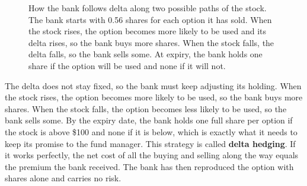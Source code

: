 \begin{figure}[htbp]
\centering
{}
\caption{How the bank follows delta along two possible paths of the stock. The bank starts with 0.56 shares for each option it has sold. When the stock rises, the option becomes more likely to be used and its delta rises, so the bank buys more shares. When the stock falls, the delta falls, so the bank sells some. At expiry, the bank holds one share if the option will be used and none if it will not.}
\label{fig:14-hedge}
\end{figure}

The delta does not stay fixed, so the bank must keep adjusting its holding. When the stock rises, the option becomes more likely to be used, so the bank buys more shares. When the stock falls, the option becomes less likely to be used, so the bank sells some. By the expiry date, the bank holds one full share per option if the stock is above \$100 and none if it is below, which is exactly what it needs to keep its promise to the fund manager. This strategy is called \textbf{delta hedging}. If it works perfectly, the net cost of all the buying and selling along the way equals the premium the bank received. The bank has then reproduced the option with shares alone and carries no risk.


